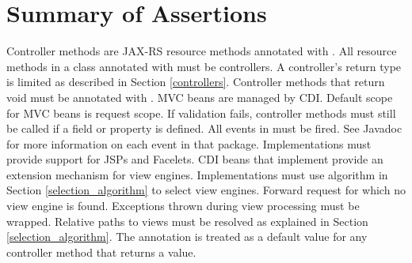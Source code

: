 \chapter{Summary of Assertions}
\label{assertions}

\begin{description}
 Controller methods are JAX-RS resource methods annotated with .
 All resource methods in a class annotated with  must
be controllers.
 A controller's return type is limited as described in Section 
\ref{controllers}.
 Controller methods that return void must be annotated with .
 MVC beans are managed by CDI.
 Default scope for MVC beans is request scope.
 If validation fails, controller methods must still be called if a 
 field or property is defined. 
 All events in  must be fired. See Javadoc for more
information on each event in that package.
 Implementations must provide support for JSPs and Facelets.
 CDI beans that implement  provide
an extension mechanism for view engines.
 Implementations must use algorithm in Section \ref{selection_algorithm} 
to select view engines.
 Forward request for which no view engine is found.
 Exceptions thrown during view processing must be wrapped.
 Relative paths to views must be resolved as explained in 
Section \ref{selection_algorithm}.
 The  annotation is treated as a default value for any controller 
method that returns a  value.
\end{description}
